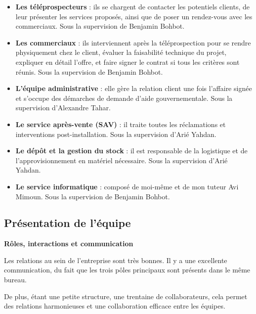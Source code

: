 \begin{itemize}
    \item \textbf{Les téléprospecteurs} : ils se chargent de contacter les potentiels clients, de leur présenter les services proposés, ainsi que de poser un rendez-vous avec les commerciaux. Sous la supervision de Benjamin Bohbot.\vspace{0.3cm}
    \item \textbf{Les commerciaux} : ils interviennent après la téléprospection pour se rendre physiquement chez le client, évaluer la faisabilité technique du projet, expliquer en détail l’offre, et faire signer le contrat si tous les critères sont réunis. Sous la supervision de Benjamin Bohbot.\vspace{0.3cm}
    \item \textbf{L’équipe administrative} : elle gère la relation client une fois l’affaire signée et s’occupe des démarches de demande d’aide gouvernementale. Sous la supervision d’Alexandre Tahar.\vspace{0.3cm}
    \item \textbf{Le service après-vente (SAV)} : il traite toutes les réclamations et interventions post-installation. Sous la supervision d’Arié Yahdan.\vspace{0.3cm}
    \item \textbf{Le dépôt et la gestion du stock} : il est responsable de la logistique et de l’approvisionnement en matériel nécessaire. Sous la supervision d’Arié Yahdan.\vspace{0.3cm}
    \item \textbf{Le service informatique} : composé de moi-même et de mon tuteur Avi Mimoun. Sous la supervision de Benjamin Bohbot.\vspace{0.3cm}
\end{itemize} \vspace{0.3cm}

\subsection{Présentation de l’équipe}

\textbf{Rôles, interactions et communication}\vspace{0.3cm}

Les relations au sein de l’entreprise sont très bonnes. Il y a une excellente communication, du fait que les trois pôles principaux sont présents dans le même bureau.

De plus, étant une petite structure, une trentaine de collaborateurs, cela permet des relations harmonieuses et une collaboration efficace entre les équipes.


